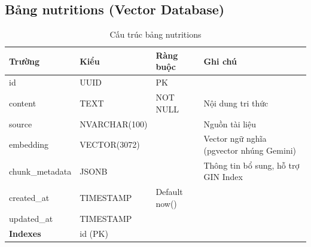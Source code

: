 \documentclass[12pt,a4paper]{article}
\begin{document}
\subsection{Bảng nutritions (Vector Database)}
\begin{longtable}{|l|l|l|p{5.5cm}|}
    \caption{Cấu trúc bảng nutritions}                                                                              \\
    \hline
    \rowcolor{headerblue}
    \textbf{Trường}  & \textbf{Kiểu}                & \textbf{Ràng buộc} & \textbf{Ghi chú}                         \\
    \hline
    id               & UUID                         & PK                 &                                          \\
    \hline
    content          & TEXT                         & NOT NULL           & Nội dung tri thức                        \\
    \hline
    source           & NVARCHAR(100)                &                    & Nguồn tài liệu                           \\
    \hline
    embedding        & VECTOR(3072)                 &                    & Vector ngữ nghĩa (pgvector nhúng Gemini) \\
    \hline
    chunk\_metadata  & JSONB                        &                    & Thông tin bổ sung, hỗ trợ GIN Index      \\
    \hline
    created\_at      & TIMESTAMP                    & Default now()      &                                          \\
    \hline
    updated\_at      & TIMESTAMP                    &                    &                                          \\
    \hline
    \rowcolor{headerblue}
    \textbf{Indexes} & \multicolumn{3}{l|}{id (PK)}                                                                 \\
    \hline
\end{longtable}
\end{document}
